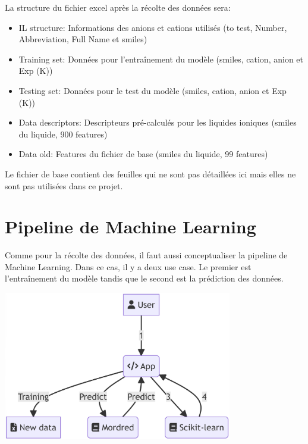 La structure du fichier excel après la récolte des données sera:
\begin{itemize}
    \item IL structure: Informations des anions et cations utilisés (to test, Number, Abbreviation, Full Name et \acrshort{smiles})
    \item Training set: Données pour l'entraînement du modèle (\acrshort{smiles}, cation, anion et Exp (K))
    \item Testing set: Données pour le test du modèle (\acrshort{smiles}, cation, anion et Exp (K))
    \item Data descriptors: Descripteurs pré-calculés pour les liquides ioniques (\acrshort{smiles} du liquide, 900 features)
    \item Data old: Features du fichier de base (\acrshort{smiles} du liquide, 99 features)
\end{itemize}

Le fichier de base contient des feuilles qui ne sont pas détaillées ici mais elles ne sont pas utilisées dans ce projet.


\section{Pipeline de Machine Learning}
Comme pour la récolte des données, il faut aussi conceptualiser la pipeline de Machine Learning.
Dans ce cas, il y a deux use case.
Le premier est l'entraînement du modèle tandis que le second est la prédiction des données.

\begin{center}
    \includegraphics[width=100mm]{img/conception-ml-pipeline.png}
\end{center}

